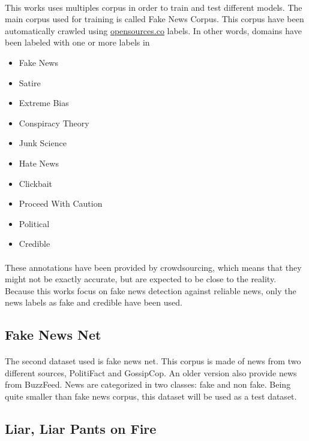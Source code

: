 \paragraph{}
This works uses multiples corpus in order to train and test different models. The main corpus used for training is called Fake News Corpus\cite{Szpakowski}. This corpus have been automatically crawled using \url{opensources.co} labels. In other words, domains have been labeled with one or more labels in \begin{itemize}
	\item Fake News
	\item Satire
	\item Extreme Bias
	\item Conspiracy Theory
	\item Junk Science
	\item Hate News
	\item Clickbait
	\item Proceed With Caution
	\item Political
	\item Credible
\end{itemize}
\paragraph{}
These annotations have been provided by crowdsourcing, which means that they might not be exactly accurate, but are expected to be close to the reality. Because this works focus on fake news detection against reliable news, only the news labels as fake and credible have been used. 

\subsection{Fake News Net}
\paragraph{}
The second dataset used is fake news net\cite{shu2018fakenewsnet,shu2017exploiting,shu2017fake}. This corpus is made of news from two different sources, PolitiFact and GossipCop. An older version also provide news from BuzzFeed. News are categorized in two classes: fake and non fake. Being quite smaller than fake news corpus, this dataset will be used as a test dataset. 

\subsection{Liar, Liar Pants on Fire}

